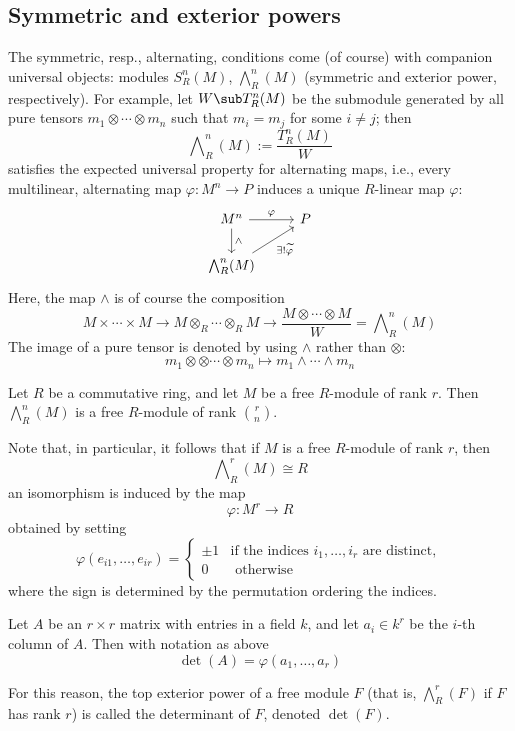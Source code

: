 \subsection{Symmetric and exterior powers}
The symmetric, resp., alternating, conditions come (of course) with companion universal objects: modules $S^n_R(M)$, $\bigwedge^n_R(M)$ (symmetric and exterior power, respectively). For example, let $W\sub T^n_R(M)$ be the submodule generated by all pure tensors $m_1\otimes\cdots\otimes m_n$ such that $m_i=m_j$ for some $i\neq j$; then
\[\bigwedge\nolimits^n_R(M):=\dfrac{T^n_R(M)}{W}\]
satisfies the expected universal property for alternating maps, i.e., every multilinear, alternating map $\varphi:M^n\to P$ induces a unique $R$-linear map $\varphi$:
\[\begin{tikzcd}
M^n\ar[r,"\varphi"]\ar[d,"\wedge"]&P\\
\bigwedge\nolimits^n_R(M)\ar[ru,swap,"\exists !\widetilde{\varphi}"]
\end{tikzcd}\]
Here, the map $\wedge$ is of course the composition
\[M\times\cdots\times M\to M\otimes_{R}\cdots\otimes_{R}M\to\dfrac{M\otimes\cdots\otimes M}{W}=\bigwedge\nolimits^n_R(M)\]
The image of a pure tensor is denoted by using $\wedge$ rather than $\otimes$:
\[m_1\otimes\otimes\cdots\otimes m_n\mapsto m_1\wedge\cdots\wedge m_n\]
\begin{lemma}
Let $R$ be a commutative ring, and let $M$ be a free $R$-module of rank $r$. Then $\bigwedge^n_R(M)$ is a free $R$-module of rank $\binom{r}{n}$.
\end{lemma}
Note that, in particular, it follows that if $M$ is a free $R$-module of rank $r$, then
\[\bigwedge\nolimits^r_R(M)\cong R\]
an isomorphism is induced by the map
\[\varphi:M^r\to R\]
obtained by setting
\[\varphi(e_{i1},\dots,e_{ir})=\left\{\begin{array}{cl}
\pm1&\text{if the indices $i_1,\dots,i_r$ are distinct},\\
0&\text{ otherwise}
\end{array}\right. \]
where the sign is determined by the permutation ordering the indices.
\begin{claim}
Let $A$ be an $r\times r$ matrix with entries in a field $k$, and let $a_i\in k^r$ be the $i$-th column of $A$. Then with notation as above
\[\det(A)=\varphi(a_1,\dots,a_r)\]
\end{claim}
For this reason, the top exterior power of a free module $F$ (that is, $\bigwedge^r_R(F)$ if $F$ has rank $r$) is called the determinant of $F$, denoted $\det(F)$.
